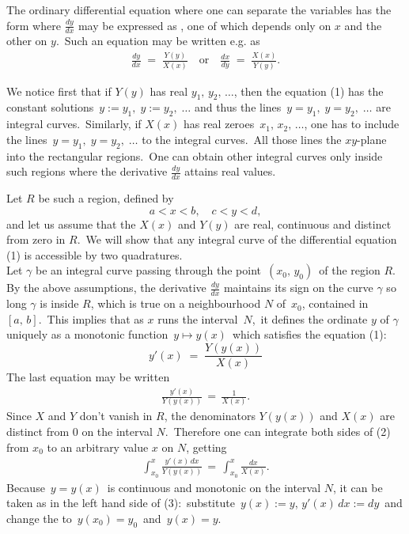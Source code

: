 \documentclass[12pt]{article}
\theoremstyle{definition}
\begin{document}
The  ordinary differential equation where one can separate the variables has the form where $\displaystyle\frac{dy}{dx}$ may be expressed as , one of which depends only on $x$ and the other on $y$.\, Such an equation may be written e.g. as
\begin{align}
\frac{dy}{dx} \;=\; \frac{Y(y)}{X(x)} \quad \mbox{or} \quad \frac{dx}{dy} \;=\; \frac{X(x)}{Y(y)}.
\end{align}


We notice first that if $Y(y)$ has real  $y_1,\,y_2,\,\ldots$, then the equation (1) has the constant solutions \,$y := y_1,\; y := y_2,\; \ldots$\; and thus the lines \,$y = y_1,\; y = y_2,\; \ldots$\; are integral curves.\, Similarly, if $X(x)$ has real zeroes \,$x_1,\,x_2,\,\ldots$, one has to include the lines\, $y = y_1,\; y = y_2,\; \ldots$\; to the integral curves.\, All those lines  the $xy$-plane into the rectangular regions.\, One can obtain other integral curves only inside such regions where the derivative $\displaystyle\frac{dy}{dx}$ attains real values.

Let $R$ be such a region, defined by
$$a < x < b, \quad c < y < d,$$
and let us assume that the $X(x)$ and $Y(y)$ are real, continuous and distinct from zero in $R$.\, We will show that any integral curve of the differential equation (1) is accessible by two quadratures.\\

Let $\gamma$ be an integral curve passing through the point \,$(x_0,\,y_0)$\, of the region $R$.\, By the above assumptions, the derivative $\displaystyle\frac{dy}{dx}$ maintains its sign on the curve $\gamma$ so long $\gamma$ is inside $R$, which is true on a neighbourhood $N$ of \,$x_0$, contained in\, $[a,\,b]$.\, This implies that as $x$ runs the interval \,$N$,\, it defines the ordinate $y$ of $\gamma$ uniquely as a monotonic function \,$y \mapsto y(x)$\, which satisfies the equation (1):
$$y'(x) \;=\; \frac{Y(y(x))}{X(x)}$$
The last equation may be written 
\begin{align}
\frac{y'(x)}{Y(y(x))} \,=\, \frac{1}{X(x)}.
\end{align}
Since $X$ and $Y$ don't vanish in $R$, the denominators $Y(y(x))$ and $X(x)$ are distinct from 0 on the interval $N$.\, Therefore one can integrate both sides of (2) from $x_0$ to an arbitrary value $x$ on $N$, getting
\begin{align}
\int_{x_0}^x\frac{y'(x)\,dx}{Y(y(x))} \,=\, \int_{x_0}^x\frac{dx}{X(x)}.
\end{align}
Because \,$y = y(x)$\, is continuous and monotonic on the interval $N$, it can be taken as  in the left hand side of (3): \,substitute\, $y(x) := y$,\; $y'(x)\,dx := dy$\, and change the  to\, $y(x_0) = y_0$\, and\, $y(x) = y$.\\
\end{document}

